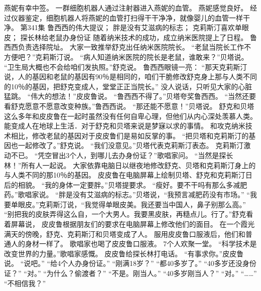 \documentclass[a4paper,12pt,UTF8,twoside]{ctexbook}
\begin{document}
        燕妮有幸中签。  
        一群细胞机器人通过注射器进入燕妮的血管。  
        燕妮感觉良好。  
        经过仪器鉴定，细胞机器人将燕妮的血管打扫得干干净净，就像婴儿的血管一样干净。          第341集  
        鲁西西的伟大提议；  
        胖是没有艾滋病的标志；  
        克莉斯汀喜欢单眼皮；  
        探长林给老鼠办身份证    
        随着纳米技术的成功，成立纳米医院提上了日程。  
        鲁西西负责选择院址。  
        大家一致推举舒克出任纳米医院院长。  
        “老鼠当院长工作不方便吧？”克莉斯汀说。  
        “病人知道纳米医院的院长是老鼠，谁敢来？”贝塔说。  
        “卫生局大概也不会给咱们发执照。”舒克说。  
        鲁西西眼镜一亮：  
        “那天克莉斯汀说，人的基因和老鼠的基因有90％是相同的，咱们干脆修改舒克身上那与人类不同的10％的基因，把舒克变成人，堂堂正正当院长。”  
        没人说话，只听见大家的心脏猛跳。  
        “伟大的想法！”皮皮鲁说。  
        “鲁西西不得了。”贝塔夸奖鲁西西。  
        “当然还要看舒克愿意不愿意改变种族。”鲁西西说。  
        “那还能不愿意！”贝塔说。  
        舒克和贝塔这么多年和皮皮鲁在一起时虽然没有任何自卑心理，但他们从内心深处羡慕人类。  
        能变成人在地球上生活．对于舒克和贝塔来说是梦寐以求的事情。  
        和攻克纳米技术相比，修改老鼠的基因对于皮皮鲁们是易如反掌的事。  
        “把贝塔和克莉斯汀的基因也一起修改了。”舒克说。  
        “我们没意见。”贝塔代表克莉斯汀表态。  
        克莉斯汀激动不已。  
        “凭空冒出3个人，到哪儿去办身份证？”歌唱家问。  
        “当然是探长林！”所有人一起说。  
        大家依靠电脑日以继夜地修改舒克、贝塔和克莉斯汀身上的与人类不同的那10％的基因。  
        皮皮鲁在电脑屏幕上绘制贝塔、舒克和克莉斯汀日后的相貌。  
        “我的身体一定要胖。”贝塔提要求。  
        “瘦好。要不干吗有那么多减肥药。”歌唱家说。  
        “胖是没有艾滋病的标志。”贝塔说，“我预言减肥药没有市场。”  
        “我要单眼皮。”克莉斯汀说，“我觉得单眼皮美。我还要当中国人，鼻子别那么高。”  
        “别把我的皮肤弄得这么自，一个大男人。我要黑皮肤，再糙点儿。行了。”舒克看着屏幕说，  
        皮皮鲁根据朋友们的要求在电脑屏幕上修改他们的面目。  
        在一个霞光满天的傍晚，舒克、克莉斯汀和贝塔变成了人。  
        服用皮皮鲁口服液后，他们和普通人的身材一样了。  
        歌唱家也喝了皮皮鲁口服液。  
        7个人欢聚一堂。  
        “科学技术是改变世界的力量。”歌唱家感慨。  
        皮皮鲁给探长林打电话。  
        “有事求你。”皮皮鲁说。  
        “说吧。”  
        “给4个人办身份证。”  
        “刚满18岁？”  
        “都40多岁了。”        
        “40多岁还没身份证？”  
        “对。”  
        “为什么？偷渡者？”  
        “不是。刚当人。”  
        “40多岁刚当人？”  
        “对。”  
        “……”  
        “不相信我？”  
\end{document}
